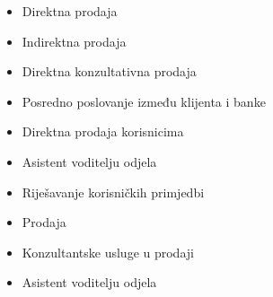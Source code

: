 \documentclass[10pt,a4paper,ragged2e,withhyper]{altacv}
\begin{document}
\begin{paracol}{2}

\divider

\begin{itemize}
\item Direktna prodaja
\item Indirektna prodaja

\end{itemize}
\divider
{}
\begin{itemize}
\item Direktna konzultativna prodaja
\item Posredno poslovanje između klijenta i banke

\end{itemize}

\divider

\begin{itemize}
\item Direktna prodaja korisnicima
\item Asistent voditelju odjela
\item Riješavanje korisničkih primjedbi
\end{itemize}


\divider


\begin{itemize}
\item Prodaja
\item Konzultantske usluge u prodaji
\item Asistent voditelju odjela
\end{itemize}





\end{paracol}
\end{document}
